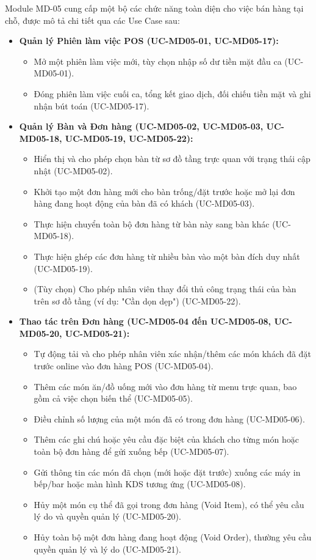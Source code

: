 \label{sssec:md05_key_functionalities}
Module MD-05 cung cấp một bộ các chức năng toàn diện cho việc bán hàng tại chỗ, được mô tả chi tiết qua các Use Case sau:

\begin{itemize}
    \item \textbf{Quản lý Phiên làm việc POS (UC-MD05-01, UC-MD05-17):}
    \begin{itemize}
        \item Mở một phiên làm việc mới, tùy chọn nhập số dư tiền mặt đầu ca (UC-MD05-01).
        \item Đóng phiên làm việc cuối ca, tổng kết giao dịch, đối chiếu tiền mặt và ghi nhận bút toán (UC-MD05-17).
    \end{itemize}

    \item \textbf{Quản lý Bàn và Đơn hàng (UC-MD05-02, UC-MD05-03, UC-MD05-18, UC-MD05-19, UC-MD05-22):}
    \begin{itemize}
        \item Hiển thị và cho phép chọn bàn từ sơ đồ tầng trực quan với trạng thái cập nhật (UC-MD05-02).
        \item Khởi tạo một đơn hàng mới cho bàn trống/đặt trước hoặc mở lại đơn hàng đang hoạt động của bàn đã có khách (UC-MD05-03).
        \item Thực hiện chuyển toàn bộ đơn hàng từ bàn này sang bàn khác (UC-MD05-18).
        \item Thực hiện ghép các đơn hàng từ nhiều bàn vào một bàn đích duy nhất (UC-MD05-19).
        \item (Tùy chọn) Cho phép nhân viên thay đổi thủ công trạng thái của bàn trên sơ đồ tầng (ví dụ: "Cần dọn dẹp") (UC-MD05-22).
    \end{itemize}

    \item \textbf{Thao tác trên Đơn hàng (UC-MD05-04 đến UC-MD05-08, UC-MD05-20, UC-MD05-21):}
    \begin{itemize}
        \item Tự động tải và cho phép nhân viên xác nhận/thêm các món khách đã đặt trước online vào đơn hàng POS (UC-MD05-04).
        \item Thêm các món ăn/đồ uống mới vào đơn hàng từ menu trực quan, bao gồm cả việc chọn biến thể (UC-MD05-05).
        \item Điều chỉnh số lượng của một món đã có trong đơn hàng (UC-MD05-06).
        \item Thêm các ghi chú hoặc yêu cầu đặc biệt của khách cho từng món hoặc toàn bộ đơn hàng để gửi xuống bếp (UC-MD05-07).
        \item Gửi thông tin các món đã chọn (mới hoặc đặt trước) xuống các máy in bếp/bar hoặc màn hình KDS tương ứng (UC-MD05-08).
        \item Hủy một món cụ thể đã gọi trong đơn hàng (Void Item), có thể yêu cầu lý do và quyền quản lý (UC-MD05-20).
        \item Hủy toàn bộ một đơn hàng đang hoạt động (Void Order), thường yêu cầu quyền quản lý và lý do (UC-MD05-21).
    \end{itemize}


\end{itemize}
